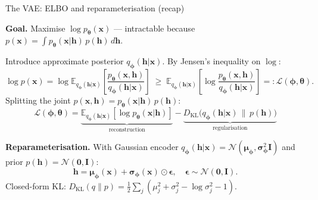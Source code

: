 \documentclass[aspectratio=169,11pt]{beamer}
\newcommand{\E}{\mathbb{E}}
\newcommand{\DKL}{D_{\mathrm{KL}}}
\newcommand{\Norm}{\mathcal{N}}
\newcommand{\ELBO}{\mathcal{L}}
\newcommand{\bx}{\bm{x}}
\newcommand{\bh}{\bm{h}}
\newcommand{\beps}{\bm{\epsilon}}
\newcommand{\bmu}{\bm{\mu}}
\newcommand{\bsig}{\bm{\sigma}}
\newcommand{\btheta}{\bm{\theta}}
\newcommand{\bphi}{\bm{\phi}}
\begin{document}
\begin{frame}{The VAE: ELBO and reparameterisation (recap)}

\textbf{Goal.} Maximise $\log p_{\btheta}(\bx)$ — intractable because
$p(\bx)=\int p_{\btheta}(\bx|\bh)\,p(\bh)\,d\bh$.

\medskip
Introduce approximate posterior $q_{\bphi}(\bh|\bx)$.
By Jensen's inequality on $\log$:
\[
  \log p(\bx)
  = \log\E_{q_{\bphi}(\bh|\bx)}\!\left[\frac{p_{\btheta}(\bx,\bh)}{q_{\bphi}(\bh|\bx)}\right]
  \;\geq\;
  \E_{q_{\bphi}(\bh|\bx)}\!\left[\log\frac{p_{\btheta}(\bx,\bh)}{q_{\bphi}(\bh|\bx)}\right]
  =: \ELBO(\bphi,\btheta).
\]
Splitting the joint $p(\bx,\bh)=p_{\btheta}(\bx|\bh)\,p(\bh)$:
\[
\boxed{
\ELBO(\bphi,\btheta)
= \underbrace{\E_{q_{\bphi}(\bh|\bx)}\!\left[\log p_{\btheta}(\bx|\bh)\right]}_{\text{reconstruction}}
- \underbrace{\DKL\!\bigl(q_{\bphi}(\bh|\bx)\,\|\,p(\bh)\bigr)}_{\text{regularisation}}}
\]

\textbf{Reparameterisation.}  With Gaussian encoder
$q_{\bphi}(\bh|\bx)=\Norm(\bmu_{\bphi},\bsig^2_{\bphi}\mathbf{I})$
and prior $p(\bh)=\Norm(\bm{0},\mathbf{I})$:
\[
  \bh = \bmu_{\bphi}(\bx) + \bsig_{\bphi}(\bx)\odot\beps,\quad
  \beps\sim\Norm(\bm{0},\mathbf{I}).
\]
Closed-form KL:
$\DKL(q\|p) = \frac{1}{2}\sum_{j}\!\left(\mu_j^2+\sigma_j^2-\log\sigma_j^2-1\right)$.
\end{frame}
\end{document}
